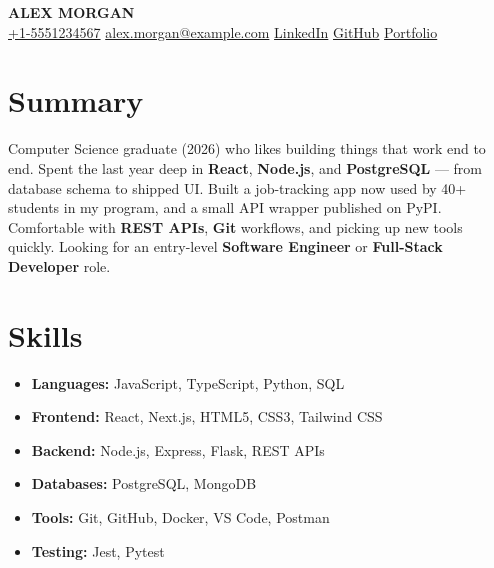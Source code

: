 \documentclass[11pt, a4paper]{article}
\begin{document}
\begin{center}
  {\fontsize{20}{24}\selectfont\bfseries ALEX MORGAN}\\[6pt]
  \faPhone\enspace\href{tel:+15551234567}{+1-5551234567}
  \;\textbar\;
  \faEnvelope\enspace
  \href{mailto:alex.morgan@example.com}{\color{linkblue}alex.morgan@example.com}
  \;\textbar\;
  \faLinkedin\enspace
  \href{https://linkedin.com/in/alexmorgan}{\color{linkblue}LinkedIn}
  \;\textbar\;
  \faGithub\enspace
  \href{https://github.com/alexmorgan}{\color{linkblue}GitHub}
  \;\textbar\;
  \faGlobe\enspace
  \href{https://alexmorgan.dev}{\color{linkblue}Portfolio}
\end{center}

\vspace{-2pt}

\section{Summary}

\normalsize
Computer Science graduate (2026) who likes building things that
work end to end. Spent the last year deep in \textbf{React},
\textbf{Node.js}, and \textbf{PostgreSQL} — from database schema
to shipped UI. Built a job-tracking app now used by 40+ students
in my program, and a small API wrapper published on PyPI.
Comfortable with \textbf{REST APIs}, \textbf{Git} workflows, and
picking up new tools quickly. Looking for an entry-level
\textbf{Software Engineer} or \textbf{Full-Stack Developer} role.

\vspace{2pt}

\section{Skills}

\vspace{3pt}
\normalsize
\begin{itemize}[
  leftmargin = 0pt,
  label      = {},
  itemsep    = 3pt,
  parsep     = 0pt,
  topsep     = 0pt
]
  \item \textbf{Languages:} JavaScript, TypeScript, Python, SQL
  \item \textbf{Frontend:} React, Next.js, HTML5, CSS3, Tailwind CSS
  \item \textbf{Backend:} Node.js, Express, Flask, REST APIs
  \item \textbf{Databases:} PostgreSQL, MongoDB
  \item \textbf{Tools:} Git, GitHub, Docker, VS Code, Postman
  \item \textbf{Testing:} Jest, Pytest
\end{itemize}
\end{document}
